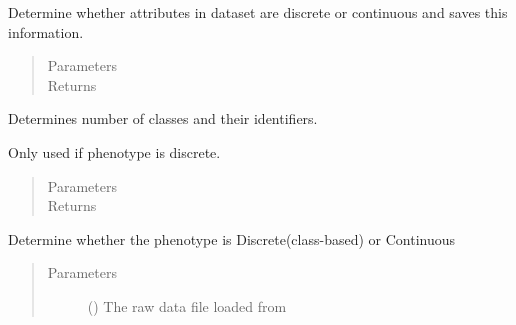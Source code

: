 \documentclass[letterpaper,10pt,english]{sphinxmanual}
\begin{document}
\begin{fulllineitems}
\begin{fulllineitems}
\label{\detokenize{eLCS:eLCS.DataManagement.DataManagement.discriminateAttributes}}
Determine whether attributes in dataset are discrete or continuous and saves this information.
\begin{quote}\begin{description}
\item[{Parameters}] \leavevmode
{} \textendash{} 

\item[{Returns}] \leavevmode


\end{description}\end{quote}

\end{fulllineitems}


\begin{fulllineitems}
\label{\detokenize{eLCS:eLCS.DataManagement.DataManagement.discriminateClasses}}
Determines number of classes and their identifiers.

Only used if phenotype is discrete.
\begin{quote}\begin{description}
\item[{Parameters}] \leavevmode
{} \textendash{} 

\item[{Returns}] \leavevmode


\end{description}\end{quote}

\end{fulllineitems}


\begin{fulllineitems}
\label{\detokenize{eLCS:eLCS.DataManagement.DataManagement.discriminatePhenotype}}
Determine whether the phenotype is Discrete(class-based) or Continuous
\begin{quote}\begin{description}
\item[{Parameters}] \leavevmode
{} () \textendash{} The raw data file loaded from


\end{description}
\end{quote}
\end{fulllineitems}
\end{fulllineitems}
\end{document}
